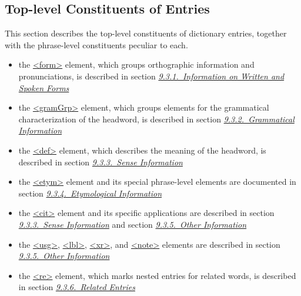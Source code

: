 \subsection[{Top-level Constituents of Entries}]{Top-level Constituents of Entries}\label{DITP}\par
This section describes the top-level constituents of dictionary entries, together with the phrase-level constituents peculiar to each.\begin{itemize}
\item the \hyperref[TEI.form]{<form>} element, which groups orthographic information and pronunciations, is described in section \textit{\hyperref[DITPFO]{9.3.1.\ Information on Written and Spoken Forms}}
\item the \hyperref[TEI.gramGrp]{<gramGrp>} element, which groups elements for the grammatical characterization of the headword, is described in section \textit{\hyperref[DITPGR]{9.3.2.\ Grammatical Information}}
\item the \hyperref[TEI.def]{<def>} element, which describes the meaning of the headword, is described in section \textit{\hyperref[DITPSE]{9.3.3.\ Sense Information}}
\item the \hyperref[TEI.etym]{<etym>} element and its special phrase-level elements are documented in section \textit{\hyperref[DITPET]{9.3.4.\ Etymological Information}}
\item the \hyperref[TEI.cit]{<cit>} element and its specific applications are described in section \textit{\hyperref[DITPSE]{9.3.3.\ Sense Information}} and section \textit{\hyperref[DITPMI]{9.3.5.\ Other Information}}
\item the \hyperref[TEI.usg]{<usg>}, \hyperref[TEI.lbl]{<lbl>}, \hyperref[TEI.xr]{<xr>}, and \hyperref[TEI.note]{<note>} elements are described in section \textit{\hyperref[DITPMI]{9.3.5.\ Other Information}}
\item the \hyperref[TEI.re]{<re>} element, which marks nested entries for related words, is described in section \textit{\hyperref[DITPRE]{9.3.6.\ Related Entries}}
\end{itemize} 
